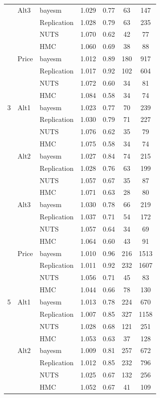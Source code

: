\begin{longtable}{cllcccc}
 & Alt3 & bayesm & 1.029 & 0.77 & 63 & 147 \\
 &  & Replication & 1.028 & 0.79 & 63 & 235 \\
 &  & NUTS & 1.070 & 0.62 & 42 & 77 \\
 &  & HMC & 1.060 & 0.69 & 38 & 88 \\
 & Price & bayesm & 1.012 & 0.89 & 180 & 917 \\
 &  & Replication & 1.017 & 0.92 & 102 & 604 \\
 &  & NUTS & 1.072 & 0.60 & 34 & 81 \\
 &  & HMC & 1.084 & 0.58 & 34 & 74 \\
3 & Alt1 & bayesm & 1.023 & 0.77 & 70 & 239 \\
 &  & Replication & 1.030 & 0.79 & 71 & 227 \\
 &  & NUTS & 1.076 & 0.62 & 35 & 79 \\
 &  & HMC & 1.075 & 0.58 & 34 & 74 \\
 & Alt2 & bayesm & 1.027 & 0.84 & 74 & 215 \\
 &  & Replication & 1.028 & 0.76 & 63 & 199 \\
 &  & NUTS & 1.057 & 0.67 & 35 & 87 \\
 &  & HMC & 1.071 & 0.63 & 28 & 80 \\
 & Alt3 & bayesm & 1.030 & 0.78 & 66 & 219 \\
 &  & Replication & 1.037 & 0.71 & 54 & 172 \\
 &  & NUTS & 1.057 & 0.64 & 34 & 69 \\
 &  & HMC & 1.064 & 0.60 & 43 & 91 \\
 & Price & bayesm & 1.010 & 0.96 & 216 & 1513 \\
 &  & Replication & 1.011 & 0.92 & 232 & 1607 \\
 &  & NUTS & 1.056 & 0.71 & 45 & 83 \\
 &  & HMC & 1.044 & 0.66 & 78 & 130 \\
5 & Alt1 & bayesm & 1.013 & 0.78 & 224 & 670 \\
 &  & Replication & 1.007 & 0.85 & 327 & 1158 \\
 &  & NUTS & 1.028 & 0.68 & 121 & 251 \\
 &  & HMC & 1.053 & 0.63 & 37 & 128 \\
 & Alt2 & bayesm & 1.009 & 0.81 & 257 & 672 \\
 &  & Replication & 1.012 & 0.85 & 232 & 796 \\
 &  & NUTS & 1.025 & 0.67 & 132 & 256 \\
 &  & HMC & 1.052 & 0.67 & 41 & 109 \\

\end{longtable}
